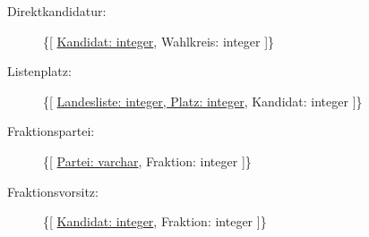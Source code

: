 \documentclass[a4paper]{article}
\begin{document}
\begin{description}

\item[Direktkandidatur:] \{[ \underline{Kandidat: integer}, Wahlkreis: integer ]\}

\item[Listenplatz:] \{[ \underline{Landesliste: integer, Platz: integer}, Kandidat: integer ]\}

\item[Fraktionspartei:] \{[ \underline{Partei: varchar}, Fraktion: integer ]\}

\item[Fraktionsvorsitz:] \{[ \underline{Kandidat: integer}, Fraktion: integer ]\}

\end{description}
\end{document}
